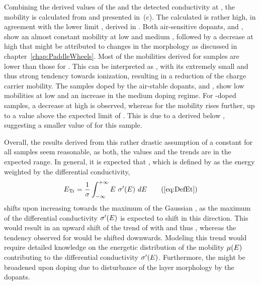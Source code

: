 Combining the derived values of the \neLong \ne and the detected conductivity at \T[40], the mobility \mob is calculated from  and presented in \,(c). The calculated \mob is rather high, in agreement with the lower limit \mobLL, derived in . Both air-sensitive dopants, \CrPd and \WPd, show an almost constant mobility at low and medium \C, followed by a decrease at high \C that might be attributed to changes in the morphology as discussed in chapter~\ref{chap:PaddleWheels}. Most of the mobilities derived for \WPd samples are lower than those for \CrPd.
This can be interpreted as \WPd, with its extremely small \IE and thus strong tendency towards ionization, resulting in a reduction of the charge carrier mobility.
%
The samples doped by the air-stable dopants, \aob and \dmbi, show low mobilities at low \CLong and an increase in the medium doping regime. For \aob-doped samples, a decrease at high \C is observed, whereas for \dmbi the mobility rises further, up to a value above the expected limit of \mobUL[5]. This is due to a derived \DopEff below \DopEffLL, suggesting a smaller value of \Et for this sample.

Overall, the results derived from this rather drastic assumption of a constant \EtLong \Et for all samples seem reasonable, as both, the values and the trends are in the expected range. In general, it is expected that \Et, which is defined by  as the energy weighted by the differential conductivity,
\begin{equation}
\Et
= \frac{1}{\c} \int_{-\infty} ^{+\infty} E ~ \c'(E) ~ dE
\tag{\ref{eq:DefEt}}
\end{equation}
shifts upon increasing \CLong towards the maximum of the Gaussian \dosLong, as the maximum of the differential conductivity $\c'(E)$ is expected to shift in this direction. This would result in an upward shift of the trend of \ne with \C and thus \DopEff, whereas the tendency observed for \mob would be shifted downwards. Modeling this trend would require detailed knowledge on the energetic distribution of the mobility $\mob(E)$ contributing to the differential conductivity $\c'(E)$.
Furthermore, the \dosLong might be broadened upon doping due to disturbance of the layer morphology by the dopants.

